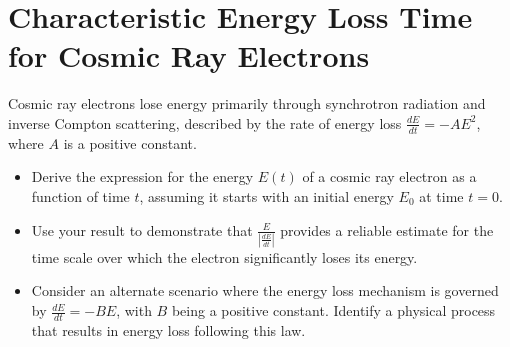 \section{Characteristic Energy Loss Time for Cosmic Ray Electrons}

Cosmic ray electrons lose energy primarily through synchrotron radiation and inverse Compton scattering, described by the rate of energy loss \(\frac{dE}{dt} = -A E^2\), where \(A\) is a positive constant.

\begin{itemize}
\item Derive the expression for the energy \(E(t)\) of a cosmic ray electron as a function of time \(t\), assuming it starts with an initial energy \(E_0\) at time \(t = 0\).
\item Use your result to demonstrate that \(\frac{E}{|\frac{dE}{dt}|}\) provides a reliable estimate for the time scale over which the electron significantly loses its energy.
\item Consider an alternate scenario where the energy loss mechanism is governed by \(\frac{dE}{dt} = -B E\), with \(B\) being a positive constant. Identify a physical process that results in energy loss following this law.
\end{itemize}
